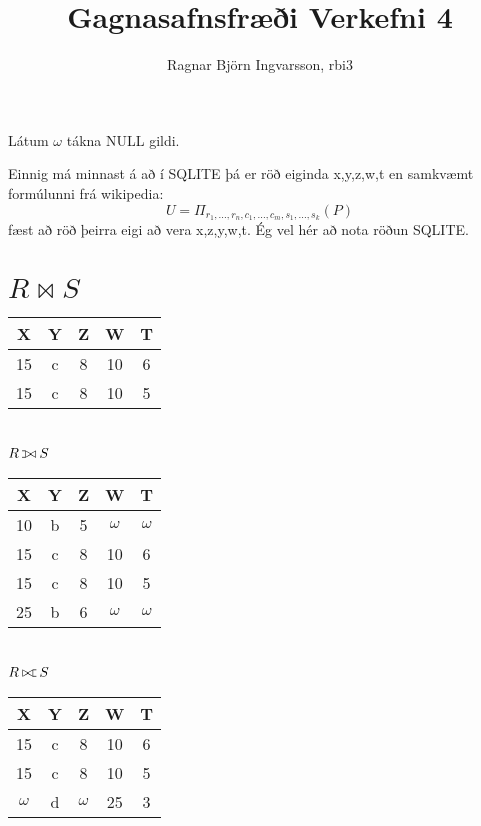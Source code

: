 \documentclass{article}
\title{Gagnasafnsfræði Verkefni 4}
\author{Ragnar Björn Ingvarsson, rbi3}
\def\ojoin{\setbox0=\hbox{$\bowtie$}%
  \rule[-.02ex]{.25em}{.5pt}\llap{\rule[\ht0]{.25em}{.5pt}}}
\def\leftouterjoin{\mathbin{\ojoin\mkern-5.8mu\bowtie}}
\def\rightouterjoin{\mathbin{\bowtie\mkern-5.8mu\ojoin}}
\begin{document}
\renewcommand\thepage{}
	
	\maketitle

	\newpage
	\setcounter{page}{1}
	\renewcommand\thepage{\arabic{page}}

	Látum $\omega$ tákna NULL gildi.

	Einnig má minnast á að í SQLITE þá er röð eiginda x,y,z,w,t en samkvæmt 
	formúlunni frá wikipedia:
	\begin{equation}
	U = \Pi_{r_1,...,r_n,c_1,...,c_m,s_1,...,s_k}(P)
	\end{equation}
	fæst að röð þeirra eigi að vera x,z,y,w,t. Ég vel 
	hér að nota röðun SQLITE.


	\section{$R\bowtie S$}
	\begin{center}
	\begin{tabular}{|c|c|c|c|c|}
		\hline
		X & Y & Z & W & T \\
		\hline
		15 & c & 8 & 10 & 6 \\
		15 & c & 8 & 10 & 5 \\
		\hline
	\end{tabular}
	\end{center}
	
	\section{$R\leftouterjoin S$}
	\begin{center}
	\begin{tabular}{|c|c|c|c|c|}
		\hline
		X & Y & Z & W & T \\
		\hline
		10 & b & 5 & $\omega$ & $\omega$ \\
		15 & c & 8 & 10 & 6 \\
		15 & c & 8 & 10 & 5 \\
		25 & b & 6 & $\omega$ & $\omega$ \\
		\hline
	\end{tabular}
	\end{center}
	\section{$R\rightouterjoin S$}
	\begin{center}
	\begin{tabular}{|c|c|c|c|c|}
		\hline
		X & Y & Z & W & T \\
		\hline
		15 & c & 8 & 10 & 6 \\
		15 & c & 8 & 10 & 5 \\
		$\omega$ & d & $\omega$ & 25 & 3 \\
		\hline
	\end{tabular}
	\end{center}
\end{document}
